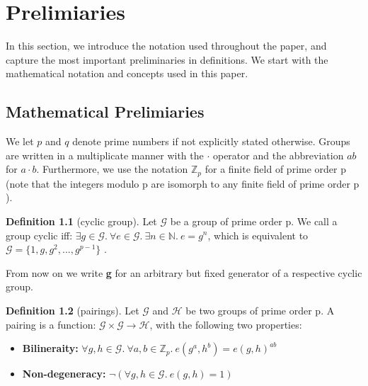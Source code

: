\chapter{Prelimiaries}\label{chapter:prelimiaries}

\theoremstyle{definition}
\newtheorem{definition}{Definition}[section]

In this section, we introduce the notation used throughout the paper, and capture the most important preliminaries in definitions. We start with the mathematical notation and concepts used in this paper.

\section{Mathematical Prelimiaries}

We let $p$ and $q$ denote prime numbers if not explicitly stated otherwise. 
Groups are written in a multiplicate manner with the  $\cdot$ operator and the abbreviation $ab$ for $a \cdot b$.
Furthermore, we use the notation $\mathbb{Z}_p$ for a finite field of prime order p (note that the integers modulo p are isomorph to any finite field of prime order p \parencite{algebra}).

\begin{definition}[cyclic group]
Let $\mathcal{G}$ be a group of prime order p. We call a group cyclic iff: $\exists g \in \mathcal{G}. \ \forall e \in \mathcal{G}. \ \exists n \in \mathbb{N}. \ e = g^n$, which is equivalent to $\mathcal{G} = \{1,g,g^2,...,g^{p-1}\}$ \parencite{algebra}.

From now on we write \textbf{g} for an arbitrary but fixed generator of a respective cyclic group. 
\end{definition}

\begin{definition}[pairings]
    Let $\mathcal{G}$ and $\mathcal{H}$ be two groups of prime order p. A pairing is a function: $\mathcal{G} \times \mathcal{G} \rightarrow \mathcal{H}$, with the following two properties:
    \begin{itemize}
        \item \textbf{Bilineraity:} $\forall g,h \in \mathcal{G}. \ \forall a,b \in \mathbb{Z}_p. \ e(g^a,h^b) = e(g,h)^{ab}$
        \item \textbf{Non-degeneracy:} $\neg (\forall g,h \in \mathcal{G}. \ e(g,h)=1)$
    \end{itemize}
    \parencite{KZG}
\end{definition}

